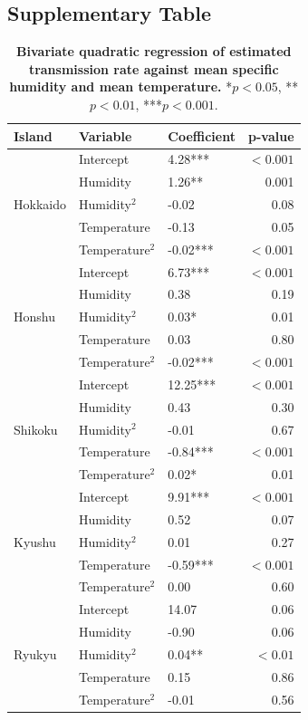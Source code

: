 \documentclass[12pt]{article}
\begin{document}
\subsection*{Supplementary Table}

\begin{table}[ht]
\centering
\begin{tabular}{l|l|l|r}
\hline
\textbf{Island} & \textbf{Variable} & \textbf{Coefficient} & \textbf{p-value} \\
\hline
\multirow{5}{*}{Hokkaido} & Intercept & 4.28*** & $<0.001$ \\
                            & Humidity & 1.26** & 0.001 \\
                            & Humidity$^2$ & -0.02 & 0.08 \\
                            & Temperature & -0.13 & 0.05 \\
                            & Temperature$^2$ & -0.02*** & $<0.001$ \\
\hline
\multirow{5}{*}{Honshu} & Intercept & 6.73*** & $<0.001$ \\
                            & Humidity & 0.38 & 0.19 \\
                            & Humidity$^2$ & 0.03* & 0.01 \\
                            & Temperature & 0.03 & 0.80 \\
                            & Temperature$^2$ & -0.02*** & $<0.001$ \\
\hline
\multirow{5}{*}{Shikoku} & Intercept & 12.25*** & $<0.001$ \\
                            & Humidity & 0.43 & 0.30 \\
                            & Humidity$^2$ & -0.01 & 0.67 \\
                            & Temperature & -0.84*** & $<0.001$ \\
                            & Temperature$^2$ & 0.02* & 0.01 \\
\hline
\multirow{5}{*}{Kyushu} & Intercept & 9.91*** & $<0.001$ \\
                            & Humidity & 0.52 & 0.07 \\
                            & Humidity$^2$ & 0.01 & 0.27 \\
                            & Temperature & -0.59*** & $<0.001$ \\
                            & Temperature$^2$ & 0.00 & 0.60 \\
\hline
\multirow{5}{*}{Ryukyu} & Intercept & 14.07 & 0.06 \\
                            & Humidity & -0.90 & 0.06 \\
                            & Humidity$^2$ & 0.04** & $<0.01$ \\
                            & Temperature & 0.15 & 0.86 \\
                            & Temperature$^2$ & -0.01 & 0.56 \\
\hline
\end{tabular}
\caption{
\textbf{Bivariate quadratic regression of estimated transmission rate against mean specific humidity and mean temperature.}
*$p<0.05$, **$p<0.01$, ***$p<0.001$.
}
\end{table}
\end{document}
